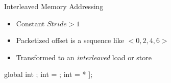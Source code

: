 \begin{frame}[fragile]{Interleaved Memory Addressing}

\begin{itemize}
    \item Constant $Stride > 1$
    \item Packetized offset is a sequence like $<0, 2, 4, 6>$
    \item Transformed to an \emph{interleaved} load or store
\end{itemize}

\begin{codebox}[commandchars=\\\[\]]
global int \uniform[*src];
int \varying[tid] = ;
int \uniform[x] = \uniform[src]\idx[\varying[tid] * \uniform[2]];
\end{codebox}


\end{frame}


